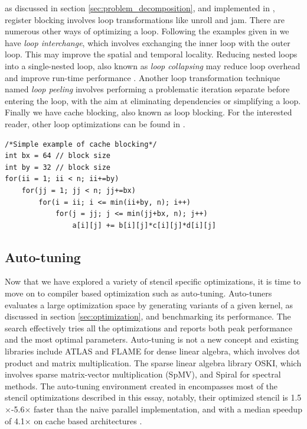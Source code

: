 as discussed in section \ref{sec:problem_decomposition}, and implemented in \cite{article1}, register blocking involves loop transformations like unroll and jam. There are numerous other ways of optimizing a loop. Following the examples given in \cite{article10} we have \textit{loop interchange}, which involves exchanging the inner loop with the outer loop. This may improve the spatial and temporal locality. Reducing nested loops into a single-nested loop, also known as \textit{loop collapsing} may reduce loop overhead and improve run-time performance \cite{article11}. Another loop transformation technique named \textit{loop peeling} involves performing a problematic iteration separate before entering the loop, with the aim at eliminating dependencies or simplifying a loop. Finally we have cache blocking, also known as loop blocking.  For the interested reader, other loop optimizations can be found in \cite{article12}.

\begin{lstlisting}[caption=Cache Blocking]
/*Simple example of cache blocking*/
int bx = 64 // block size
int by = 32 // block size
for(ii = 1; ii < n; ii+=by)
 	for(jj = 1; jj < n; jj+=bx)
     	for(i = ii; i <= min(ii+by, n); i++)
         	for(j = jj; j <= min(jj+bx, n); j++)
         		a[i][j] += b[i][j]*c[i][j]*d[i][j]
\end{lstlisting}

\subsection{Auto-tuning}
Now that we have explored a variety of stencil specific optimizations, it is time to move on to compiler based optimization such as auto-tuning. Auto-tuners evaluates a large optimization space by generating variants of a given kernel, as discussed in section \ref{sec:optimization}, and benchmarking its performance. The search effectively tries all the optimizations and reports both peak performance and the most optimal parameters. Auto-tuning is not a new concept and existing libraries include ATLAS and FLAME for dense linear algebra, which involves dot product and matrix multiplication. The sparse linear algebra library OSKI, which involves sparse matrix-vector multiplication (SpMV), and Spiral for spectral methods. The auto-tuning environment created in \cite{article1} encompasses most of the stencil optimizations described in this essay, notably, their optimized stencil is 1.5\(\times\)-5.6\(\times\) faster than the naive parallel implementation, and with a median speedup of 4.1\(\times\)  on cache based architectures \cite{article1}.

